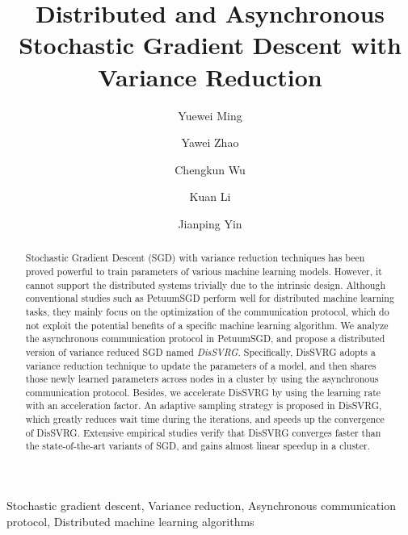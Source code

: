 \documentclass[preprint,review,11pt,a4paper]{elsarticle}
\begin{document}
\begin{frontmatter}

\title{Distributed and Asynchronous Stochastic Gradient Descent with Variance Reduction}

\author[mymainaddress]{Yuewei Ming}

\author[mymainaddress]{Yawei Zhao}
\author[mymainaddress]{Chengkun Wu}
\author[mymainaddress]{Kuan Li}
\author[mysecondaryaddress]{Jianping Yin}
\address[mymainaddress]{College of Computer,\\ National University of Defense Technology, Changsha 410073, China}
\address[mysecondaryaddress]{State Key Laboratory of High Performance Computing,\\ National University of Defense Technology, Changsha, 410073, China}

\begin{abstract}
Stochastic Gradient Descent (SGD) with variance reduction techniques has been proved powerful to train parameters of various machine learning models. However, it cannot support the distributed systems trivially due to the intrinsic design.  Although conventional studies such as PetuumSGD perform well for distributed machine learning tasks, they mainly focus on the optimization of the communication protocol, which do not exploit the potential benefits of a specific machine learning algorithm. We analyze the asynchronous communication protocol in PetuumSGD, and propose a distributed version of variance reduced SGD named \emph{DisSVRG}. Specifically, DisSVRG adopts a variance reduction technique to update the parameters of a model, and then shares those newly learned parameters across nodes in a cluster by using the asynchronous communication protocol. Besides, we accelerate DisSVRG by using the learning rate with an acceleration factor. An adaptive sampling strategy is proposed in DisSVRG, which greatly reduces wait time during the iterations, and speeds up the convergence of DisSVRG. Extensive empirical studies verify that DisSVRG  converges faster than the state-of-the-art variants of SGD, and gains almost linear speedup in a cluster.
\end{abstract}

\begin{keyword}
Stochastic gradient descent, Variance reduction, Asynchronous communication protocol, Distributed machine learning algorithms
\end{keyword}

\end{frontmatter}
\end{document}
